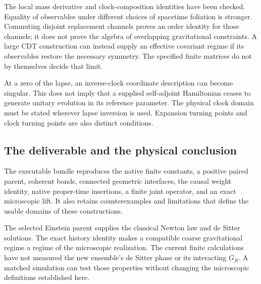 The local mass derivative and clock-composition identities have been checked. Equality of observables under different choices of spacetime foliation is stronger. Commuting disjoint replacement channels proves an order identity for those channels; it does not prove the algebra of overlapping gravitational constraints. A large CDT construction can instead supply an effective covariant regime if its observables restore the necessary symmetry. The specified finite matrices do not by themselves decide that limit.

At a zero of the lapse, an inverse-clock coordinate description can become singular. This does not imply that a supplied self-adjoint Hamiltonian ceases to generate unitary evolution in its reference parameter. The physical clock domain must be stated wherever lapse inversion is used. Expansion turning points and clock turning points are also distinct conditions.

\subsection{The deliverable and the physical conclusion}

The executable bundle reproduces the native finite constants, a positive paired parent, coherent bonds, connected geometric interfaces, the causal weight identity, native proper-time insertions, a finite joint operator, and an exact microscopic lift. It also retains counterexamples and limitations that define the usable domains of these constructions.

The selected Einstein parent supplies the classical Newton law and de Sitter solutions. The exact history identity makes a compatible coarse gravitational regime a regime of the microscopic realization. The current finite calculations have not measured the new ensemble's de Sitter phase or its interacting $G_R$. A matched simulation can test those properties without changing the microscopic definitions established here.
